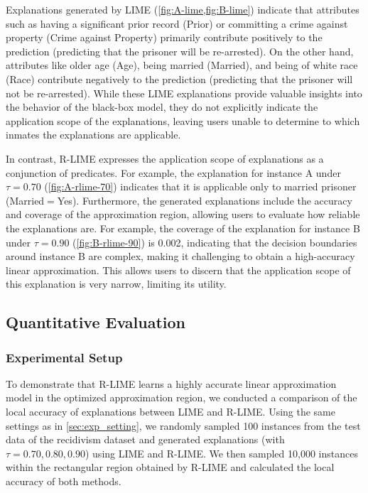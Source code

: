 \documentclass[runningheads]{llncs}
\begin{document}
Explanations generated by LIME (\cref{fig:A-lime,fig:B-lime}) indicate that
attributes such as having a significant prior record (Prior) or committing a
crime against property (Crime against Property) primarily contribute positively
to the prediction (predicting that the prisoner will be re-arrested).
On the other hand,
attributes like older age (Age), being married (Married),
and being of white race (Race) contribute negatively to the prediction
(predicting that the prisoner will not be re-arrested).
While these LIME explanations provide valuable insights into the behavior of
the black-box model,
they do not explicitly indicate the application scope of the explanations,
leaving users unable to determine to which inmates the explanations are applicable.

In contrast, R-LIME expresses the application scope of explanations
as a conjunction of predicates.
For example, the explanation for instance A
under $\tau=0.70$ (\cref{fig:A-rlime-70}) indicates that it is applicable
only to married prisoner (Married$=$Yes).
Furthermore, the generated explanations include the accuracy and coverage of
the approximation region, allowing users to evaluate how reliable the
explanations are.
For example, the coverage of the explanation for instance B under $\tau=0.90$
(\cref{fig:B-rlime-90}) is 0.002,
indicating that the decision boundaries around instance B are complex,
making it challenging to obtain a high-accuracy linear approximation.
This allows users to discern that the application scope of this explanation is
very narrow, limiting its utility.

\subsection{Quantitative Evaluation}\label{sec:exp2}
\subsubsection{Experimental Setup}
To demonstrate that R-LIME learns a highly accurate linear approximation model
in the optimized approximation region,
we conducted a comparison of the local accuracy of explanations
between LIME and R-LIME\@.
Using the same settings as in \cref{sec:exp_setting},
we randomly sampled 100 instances from the test data of the recidivism dataset
and generated explanations (with $\tau=0.70,0.80,0.90$) using LIME and R-LIME\@.
We then sampled 10,000 instances within the rectangular region
obtained by R-LIME and calculated the local accuracy of both methods.
\end{document}
